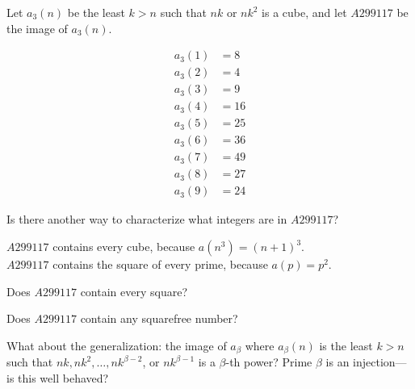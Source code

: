 \documentclass{article}
\begin{document}
Let $a_3(n)$ be the least $k > n$ such that $nk$ or $nk^2$ is a cube, and
let $A299117$ be the image of $a_3(n)$.
\begin{figure}[!h]
  \centering
  \begin{align*}
    a_3(1) &= 8\\
    a_3(2) &= 4\\
    a_3(3) &= 9\\
    a_3(4) &= 16\\
    a_3(5) &= 25\\
    a_3(6) &= 36\\
    a_3(7) &= 49\\
    a_3(8) &= 27\\
    a_3(9) &= 24
  \end{align*}
\end{figure}

\begin{question}
  Is there another way to characterize what integers are in $A299117$?
\end{question}

\begin{note}
  $A299117$ contains every cube, because $a(n^3) = (n + 1)^3$.\\
  $A299117$ contains the square of every prime, because $a(p) = p^2$.
\end{note}

\begin{related}
  \item Does $A299117$ contain every square?
  \item Does $A299117$ contain any squarefree number?
  \item What about the generalization: the image of $a_\beta$ where $a_\beta(n)$
    is the least $k > n$ such that $nk, nk^2, \hdots, nk^{\beta-2}$, or $nk^{\beta-1}$
    is a $\beta$-th power? Prime $\beta$ is an injection---is this well behaved?
\end{related}
\end{document}

